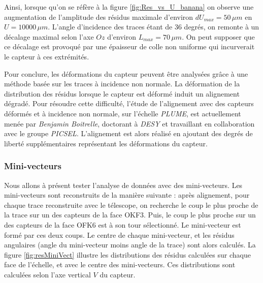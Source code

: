   \medskip
  
  Ainsi, lorsque qu'on se r\'ef\`ere \`a la figure \ref{fig:Res_vs_U_banana} on observe une augmentation de l'amplitude des r\'esidus maximale d'environ $dU_{max} = 50 \, \mu m$ en $U=10000 \, \mu m$. L'angle d'incidence des traces \'etant de 36 degr\'es, on remonte \`a un d\'ecalage maximal selon l'axe $Oz$ d'environ $L_{max} = 70 \, \mu m$. On peut supposer que ce d\'ecalage est provoqu\'e par une \'epaisseur de colle non uniforme qui incurverait le capteur \`a ces extr\'emit\'es.
  
  \medskip
  
  Pour conclure, les d\'eformations du capteur peuvent \^etre analys\'ees gr\^ace \`a une m\'ethode bas\'ee sur les traces \`a incidence non normale. La d\'eformation de la distribution des r\'esidus lorsque le capteur est d\'eform\'e induit un alignement d\'egrad\'e. Pour r\'esoudre cette difficult\'e, l'\'etude de l'alignement avec des capteurs d\'eform\'es et \`a incidence non normale, sur l'\'echelle \textit{PLUME}, est actuellement men\'ee par \textit{Benjamin Boitrelle}, doctorant \`a \textit{DESY} et travaillant en collaboration avec le groupe \textit{PICSEL}. L'alignement est alors r\'ealis\'e en ajoutant des degr\'es de libert\'e suppl\'ementaires repr\'esentant les d\'eformations du capteur.
  
%   
  
  \FloatBarrier
  
  \subsubsection{Mini-vecteurs}
  
  Nous allons \`a pr\'esent tester l'analyse de donn\'ees avec des mini-vecteurs. Les mini-vecteurs sont reconstruits de la mani\`ere suivante : apr\`es alignement, pour chaque trace reconstruite avec le t\'elescope, on recherche le coup le plus proche de la trace sur un des capteurs de la face OKF3. Puis, le coup le plus proche sur un des capteurs de la face OFK6 est à son tour s\'electionné. Le mini-vecteur est form\'e par ces deux coups. Le centre de chaque mini-vecteur, et les r\'esidus angulaires (angle du mini-vecteur moins angle de la trace) sont alors calcul\'es. La figure \ref{fig:resMiniVect} illustre les distributions des r\'esidus calcul\'ees sur chaque face de l'\'echelle, et avec le centre des mini-vecteurs. Ces distributions sont calcul\'ees selon l'axe vertical $V$ du capteur.
  
